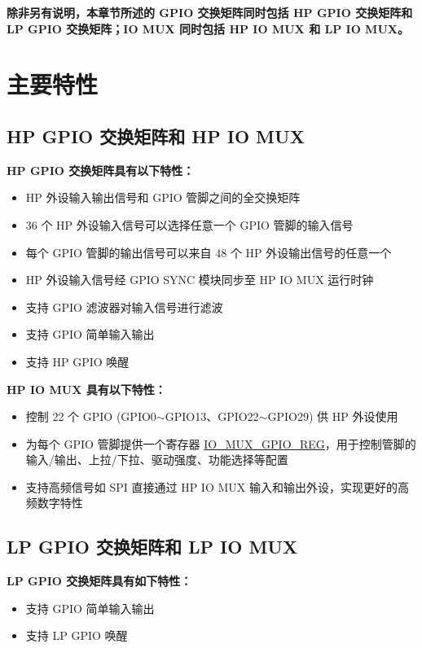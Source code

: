 \documentclass[main\_\_CN.tex]{subfiles}
\begin{document}
\textbf{除非另有说明，本章节所述的 GPIO 交换矩阵同时包括 HP GPIO 交换矩阵和 LP GPIO 交换矩阵；IO MUX 同时包括 HP IO MUX 和 LP IO MUX。}

\section{主要特性}
\subsection{HP GPIO 交换矩阵和 HP IO MUX}

\textbf{HP GPIO 交换矩阵具有以下特性：}
\begin{itemize}
\item HP 外设输入输出信号和 GPIO 管脚之间的全交换矩阵
\item 36 个 HP 外设输入信号可以选择任意一个 GPIO 管脚的输入信号
\item 每个 GPIO 管脚的输出信号可以来自 48 个 HP 外设输出信号的任意一个
\item HP 外设输入信号经 GPIO SYNC 模块同步至 HP IO MUX 运行时钟
\item 支持 GPIO 滤波器对输入信号进行滤波
\item 支持 GPIO 简单输入输出
\item 支持 HP GPIO 唤醒
\end{itemize}

\textbf{HP IO MUX 具有以下特性：}
\begin{itemize}
\item 控制 22 个 GPIO (GPIO0$\sim$GPIO13、GPIO22$\sim$GPIO29) 供 HP 外设使用
\item 为每个 GPIO 管脚提供一个寄存器 \hyperref[regdesc:IOMUXGPIONREG]{IO\_MUX\_GPIO\_REG}，用于控制管脚的输入/输出、上拉/下拉、驱动强度、功能选择等配置
\item 支持高频信号如 SPI 直接通过 HP IO MUX 输入和输出外设，实现更好的高频数字特性
\end{itemize}

\subsection{LP GPIO 交换矩阵和 LP IO MUX}

\textbf{LP GPIO 交换矩阵具有如下特性：}
\begin{itemize}
\item 支持 GPIO 简单输入输出
\item 支持 LP GPIO 唤醒
\end{itemize}
\end{document}

